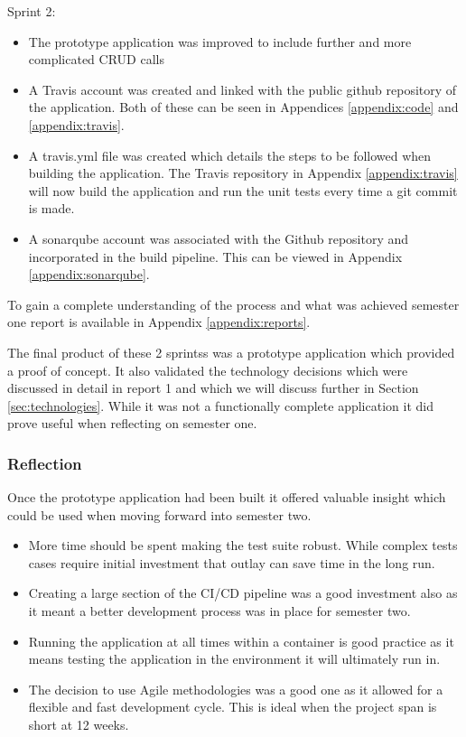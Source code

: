 Sprint 2:
\begin{itemize}
	\item The prototype application was improved to include further and more complicated \gls{CRUD} calls
	\item A \gls{Travis} account was created and linked with the public \gls{github} repository of the application. Both of these can be seen in Appendices \ref{appendix:code} and \ref{appendix:travis}.
	\item A travis.yml file was created which details the steps to be followed when building the application. The Travis repository in Appendix \ref{appendix:travis} will now build the application and run the unit tests every time a \gls{git} commit is made.
	\item A \gls{sonarqube} account was associated with the Github repository and incorporated in the build pipeline. This can be viewed in Appendix \ref{appendix:sonarqube}.
\end{itemize}
	
To gain a complete understanding of the process and what was achieved semester one report is available in Appendix \ref{appendix:reports}.
	
The final product of these 2 \glspl{sprint}s was a prototype application which provided a proof of concept. It also validated the technology decisions which were discussed in detail in report 1 and which we will discuss further in Section \ref{sec:technologies}. While it was not a functionally complete application it did prove useful when reflecting on semester one.
	
\subsubsection{Reflection}
Once the prototype application had been built it offered valuable insight which could be used when moving forward into semester two.

\begin{itemize}
	\item More time should be spent making the test suite robust. While complex tests cases require initial investment that outlay can save time in the long run.
	\item Creating a large section of the CI/CD pipeline was a good investment also as it meant a better development process was in place for semester two.
	\item Running the application at all times within a container is good practice as it means testing the application in the environment it will ultimately run in.
	\item The decision to use Agile methodologies was a good one as it allowed for a flexible and fast development cycle. This is ideal when the project span is short at 12 weeks.
\end{itemize}
